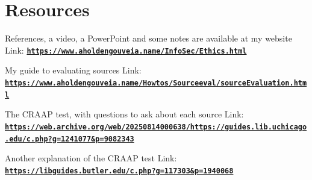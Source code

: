 \documentclass[12pt]{article}
\begin{document}
\section*{Resources}
References, a video, a PowerPoint and some notes are available at my website
Link: \href{https://www.aholdengouveia.name/InfoSec/Ethics.html}{\textbf{\nolinkurl{https://www.aholdengouveia.name/InfoSec/Ethics.html}}}

My guide to evaluating sources
Link: \href{https://www.aholdengouveia.name/Howtos/Sourceeval/sourceEvaluation.html}{\textbf{\nolinkurl{https://www.aholdengouveia.name/Howtos/Sourceeval/sourceEvaluation.html}}}

The CRAAP test, with questions to ask about each source
Link: \href{https://web.archive.org/web/20250814000638/https://guides.lib.uchicago.edu/c.php?g=1241077&p=9082343}{\textbf{\nolinkurl{https://web.archive.org/web/20250814000638/https://guides.lib.uchicago.edu/c.php?g=1241077&p=9082343}}}

Another explanation of the CRAAP test
Link: \href{https://libguides.butler.edu/c.php?g=117303&p=1940068}{\textbf{\nolinkurl{https://libguides.butler.edu/c.php?g=117303&p=1940068}}}
\end{document}
